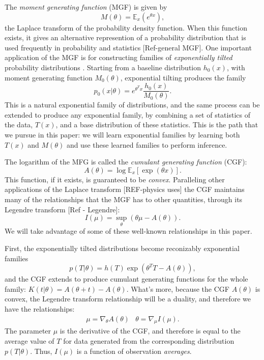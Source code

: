 \documentclass[10pt]{article}      %
\begin{document}
The \textit{moment generating function} (MGF) is given by
\begin{equation}
  M(\theta) = \mathbb{E}_x(e^{\theta x}), \label{def:MGF}
\end{equation}
the Laplace transform of the probability density function.
When this function exists, it gives an alternative represention of a probability distribution that is used frequently in probability and statistics [Ref-general MGF].
One important application of the MGF is for constructing families of \textit{exponentially tilted} probability distributions \cite{morris_natural_1982,morris_unifying_2009}.
Starting from a baseline distribution $h_0(x)$, with moment generating function $M_0(\theta)$, exponential tilting produces the family
\begin{equation}
  p_0(x | \theta) = e^{\theta^T x} \frac{h_0(x)}{M_0(\theta)}. \label{def:exponential_tilt}
\end{equation}
This is a natural exponential family of distributions, and the same process can be extended to produce any exponential family, by combining a set of statistics of the data, $T(x)$, and a base distribution of these statistics.
This is the path that we pursue in this paper: we will learn exponential families by learning both $T(x)$ and $M(\theta)$ and use these learned families to perform inference.

The logarithm of the MFG is called the \textit{cumulant generating function} (CGF):
\begin{equation}
  A(\theta) = \log \mathbb{E}_x[\exp(\theta x)]. \label{def:cgf}
\end{equation}
This function, if it exists, is guaranteed to be \textit{convex}.
Paralleling other applications of the Laplace transform [REF-physics uses] the CGF maintains many of the relationships that the MGF has to other quantities, through its Legendre transform [Ref - Legendre]:
\begin{equation}
  I(\mu) = \sup_{\theta}( \theta \mu - A(\theta) ). \label{eq:legendre_transform}
\end{equation}
We will take advantage of some of these well-known relationships in this paper.

First, the exponentially tilted distributions become reconizably exponential families
\begin{equation}
  p(T | \theta) = h(T) \exp( \theta^T T - A(\theta) ),
\end{equation}
and the CGF extends to produce cumulant generating functions for the whole family: $K(t | \theta) = A(\theta + t) - A(\theta)$.
What's more, because the CGF $A(\theta)$ is convex, the Legendre transform relationship will be a duality, and therefore we have the relationships:
\begin{eqnarray}
  \mu = \nabla_\theta A(\theta) & \theta = \nabla_\mu I(\mu). \label{eq:duality_relations}
\end{eqnarray}
The parameter $\mu$ is the derivative of the CGF, and therefore is equal to the average value of $T$ for data generated from the corresponding distribution $p(T|\theta)$.
Thus, $I(\mu)$ is a function of observation \textit{averages}.
\end{document}
